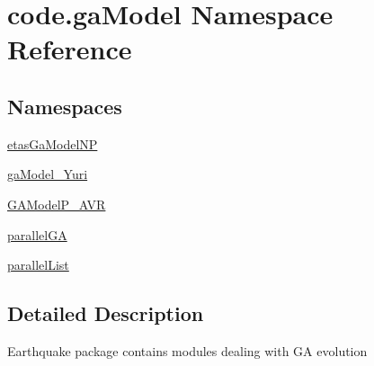\hypertarget{namespacecode_1_1ga_model}{}\section{code.\+ga\+Model Namespace Reference}
\label{namespacecode_1_1ga_model}
\subsection*{Namespaces}
\begin{DoxyCompactItemize}
\item 
 \hyperlink{namespacecode_1_1ga_model_1_1etas_ga_model_n_p}{etas\+Ga\+Model\+NP}
\item 
 \hyperlink{namespacecode_1_1ga_model_1_1ga_model___yuri}{ga\+Model\+\_\+\+Yuri}
\item 
 \hyperlink{namespacecode_1_1ga_model_1_1_g_a_model_p___a_v_r}{G\+A\+Model\+P\+\_\+\+A\+VR}
\item 
 \hyperlink{namespacecode_1_1ga_model_1_1parallel_g_a}{parallel\+GA}
\item 
 \hyperlink{namespacecode_1_1ga_model_1_1parallel_list}{parallel\+List}
\end{DoxyCompactItemize}


\subsection{Detailed Description}
\begin{DoxyVerb}Earthquake package contains modules dealing with GA evolution 
\end{DoxyVerb}
 